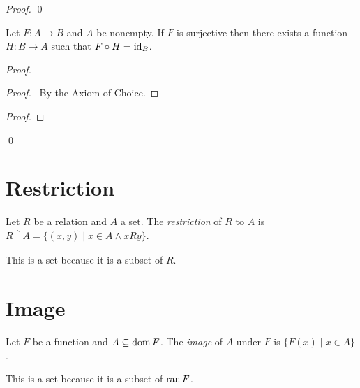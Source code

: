 \begin{proof}
    \pf
    \qed
\end{proof}

\begin{theorem}
    Let $F : A \rightarrow B$ and $A$ be nonempty. If $F$ is surjective
    then there exists a function $H : B \rightarrow A$ such that $F \circ H = \mathrm{id}_{B}$.
\end{theorem}

\begin{proof}
    \pf
    \begin{proof}
        \pf\ By the Axiom of Choice.
    \end{proof}
    \begin{proof}
    \end{proof}
    \qed
\end{proof}

\section{Restriction}

\begin{definition}
    Let $R$ be a relation and $A$ a set. The \emph{restriction} of $R$ to $A$
    is $R \restriction A = \{ (x,y) \mid x \in A \wedge xRy \}$.

    This is a set because it is a subset of $R$.
\end{definition}

\section{Image}

\begin{definition}
    Let $F$ be a function and $A \subseteq \operatorname{dom} F$. The \emph{image} of $A$
    under $F$ is $\{ F(x) \mid x \in A \}$.

    This is a set because it is a subset of $\operatorname{ran} F$.
\end{definition}

